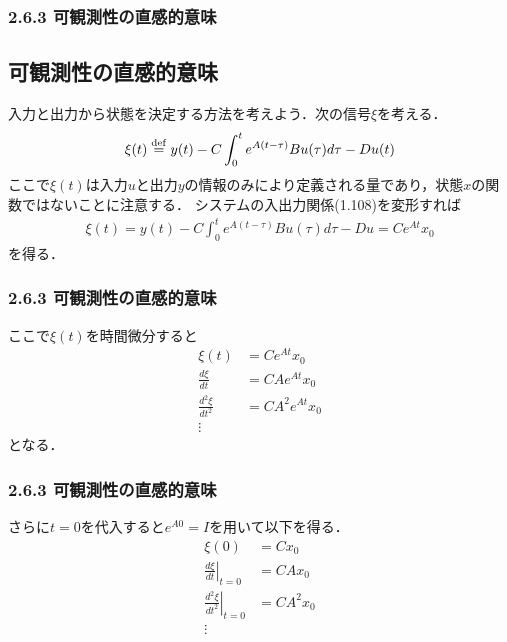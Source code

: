 \begin{frame}[t]
\frametitle{2.6.3 可観測性の直感的意味}
\subsection{可観測性の直感的意味}

入力と出力から状態を決定する方法を考えよう．次の信号$\xi$を考える．
\begin{align}
 \xi(t) \stackrel{\rm def}{=} y(t) -  C\int_0^t e^{A(t-\tau)} B u (\tau) d \tau - D u(t)
\end{align}
ここで$\xi(t)$は入力$u$と出力$y$の情報のみにより定義される量であり，状態$x$の関数ではないことに注意する．
システムの入出力関係(1.108)を変形すれば
\begin{align}
 \xi(t) = y(t) -  C\int_0^t e^{A(t-\tau)} B u (\tau) d \tau - D u= Ce^{At} x_0 
\end{align}
を得る．
\end{frame}

\begin{frame}[t]
\frametitle{2.6.3 可観測性の直感的意味}
ここで$\xi(t)$を時間微分すると
\begin{align}
 \xi(t) &= C e^{At} x_0
\nonumber \\
 \frac{d \xi}{dt} & = C A e^{At} x_0
\nonumber \\
 \frac{d^2 \xi}{dt^2} &= C A^2 e^{At} x_0
\\
 \vdots
\nonumber 
\end{align}
となる．
\end{frame}

\begin{frame}[t]
\frametitle{2.6.3 可観測性の直感的意味}
さらに$t=0$を代入すると$e^{A0}=I$を用いて以下を得る．
\begin{align}
 \xi(0) &= C x_0
\nonumber \\
 \left. \frac{d \xi}{dt} \right \vert_{t=0} & = C A  x_0
\nonumber \\
 \left. \frac{d^2 \xi}{dt^2} \right \vert_{t=0}&= C A^2  x_0
\\
 \vdots
\nonumber
\end{align}
\end{frame}

